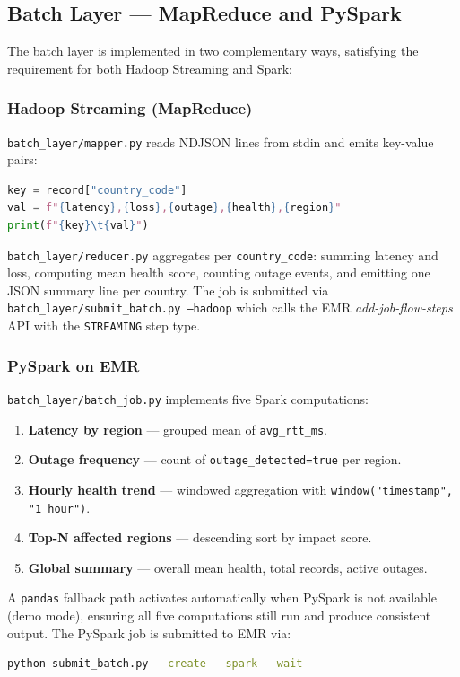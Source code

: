 \documentclass[conference]{IEEEtran}
\begin{document}
\subsection{Batch Layer — MapReduce and PySpark}

The batch layer is implemented in two complementary ways, satisfying the
requirement for both Hadoop Streaming and Spark:

\subsubsection{Hadoop Streaming (MapReduce)}

\texttt{batch\_layer/mapper.py} reads NDJSON lines from stdin and emits
key-value pairs:
\begin{lstlisting}[language=Python, caption=Mapper excerpt]
key = record["country_code"]
val = f"{latency},{loss},{outage},{health},{region}"
print(f"{key}\t{val}")
\end{lstlisting}

\texttt{batch\_layer/reducer.py} aggregates per \texttt{country\_code}: summing
latency and loss, computing mean health score, counting outage events, and
emitting one JSON summary line per country. The job is submitted via
\texttt{batch\_layer/submit\_batch.py --hadoop} which calls the EMR
\textit{add-job-flow-steps} API with the \texttt{STREAMING} step type.

\subsubsection{PySpark on EMR}

\texttt{batch\_layer/batch\_job.py} implements five Spark computations:
\begin{enumerate}
  \item \textbf{Latency by region} — grouped mean of \texttt{avg\_rtt\_ms}.
  \item \textbf{Outage frequency} — count of \texttt{outage\_detected=true} per region.
  \item \textbf{Hourly health trend} — windowed aggregation with
    \texttt{window("timestamp", "1 hour")}.
  \item \textbf{Top-N affected regions} — descending sort by impact score.
  \item \textbf{Global summary} — overall mean health, total records, active outages.
\end{enumerate}

A \texttt{pandas} fallback path activates automatically when PySpark is not
available (demo mode), ensuring all five computations still run and produce
consistent output. The PySpark job is submitted to EMR via:
\begin{lstlisting}[language=bash]
python submit_batch.py --create --spark --wait
\end{lstlisting}
\end{document}
